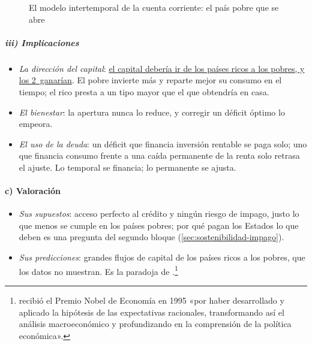 \documentclass[11pt]{article}
\begin{document}
\begin{figure}[H]
\centering
\caption{El modelo intertemporal de la cuenta corriente: el país pobre que se abre}\label{fig:cc-intertemporal}
\end{figure}

\subparagraph{iii) Implicaciones}

\begin{itemize}
\item \emph{La dirección del capital}: \uline{el capital debería ir de los países ricos a los pobres, y los 2~ganarían}. El pobre invierte más y reparte mejor su consumo en el tiempo; el rico presta a un tipo mayor que el que obtendría en casa.
\item \emph{El bienestar}: la apertura nunca lo reduce, y corregir un déficit óptimo lo empeora.
\item \emph{El uso de la deuda}: un déficit que financia inversión rentable se paga solo; uno que financia consumo frente a una caída permanente de la renta solo retrasa el ajuste. Lo temporal se financia; lo permanente se ajusta\nocite{ObstfeldRogoff1996Foundations}.
\end{itemize}

\paragraph{c) Valoración}

\begin{itemize}
\item \emph{Sus supuestos}: acceso perfecto al crédito y ningún riesgo de impago, justo lo que menos se cumple en los países pobres; por qué pagan los Estados lo que deben es una pregunta del segundo bloque (\ref{sec:sostenibilidad-impago}).
\item \emph{Sus predicciones}: grandes flujos de capital de los países ricos a los pobres, que los datos no muestran. Es la paradoja de .\footnote{ recibió el Premio Nobel de Economía en 1995 «por haber desarrollado y aplicado la hipótesis de las expectativas racionales, transformando así el análisis macroeconómico y profundizando en la comprensión de la política económica»\nocite{NobelPrize1995Lucas}.}
\end{itemize}
\end{document}
